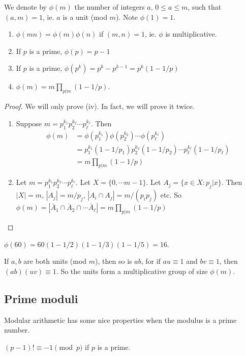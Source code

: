 \documentclass[a4paper]{article}
\begin{document}
\begin{defi}
  We denote by $\phi(m)$ the number of integers $a$, $0\leq a\leq m$, such that $(a, m) = 1$, ie. $a$ is a unit (mod $m$). Note $\phi(1) = 1$.
\end{defi}

\begin{prop}\leavevmode
  \begin{enumerate}
    \item $\phi(mn) = \phi(m)\phi(n)$ if $(m, n) = 1$, ie. $\phi$ is multiplicative.
    \item If $p$ is a prime, $\phi(p) = p - 1$
    \item If $p$ is a prime, $\phi(p^k) = p^k - p^{k - 1} = p^k(1 - 1/p)$
    \item $\phi(m) = m\prod_{p | m}(1 - 1/p)$.
  \end{enumerate}
\end{prop}

\begin{proof}
  We will only prove (iv). In fact, we will prove it twice.
  \begin{enumerate}
    \item Suppose $m = p_1^{k_1}p_2^{k_2}\cdots p_\ell^{k_\ell}$. Then
      \begin{align*}
        \phi(m) &= \phi(p_1^{k_1})\phi(p_2^{k_2})\cdots \phi(p_\ell^{k_\ell})\\
        &= p_1^{k_1}(1-1/p_1)p_2^{k_2}(1 - 1/p_2)\cdots p_\ell^{k_\ell}(1 - 1/p_\ell)\\
        &= m\prod_{p | m}(1 - 1/p)
      \end{align*}
    \item Let $m = p_1^{k_1}p_2^{k_2}\cdots p_\ell^{k_\ell}$. Let $X = \{0, \cdots m - 1\}$. Let $A_j = \{x\in X: p_j|x\}$. Then $|X| = m$, $|A_j| = m/p_j$, $|A_i\cap A_j| = m/(p_ip_j)$ etc. So $\phi(m) = |\bar A_1\cap \bar A_2\cap \cdots \bar A_\ell| = m\prod_{p | m}(1 - 1/p)$
  \end{enumerate}
\end{proof}

\begin{eg}
  $\phi(60) = 60(1 - 1/2)(1 - 1/3)(1 - 1/5) = 16$.
\end{eg}

If $a, b$ are both units (mod $m$), then so is $ab$, for if $au \equiv 1$ and $bv \equiv 1$, then $(ab)(uv)\equiv 1$. So the units form a multiplicative group of size $\phi(m)$.

\subsection{Prime moduli}
Modular arithmetic has some nice properties when the modulus is a prime number.
\begin{thm}
  $(p - 1)! \equiv -1\pmod p$ if $p$ is a prime.
\end{thm}
\end{document}
